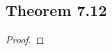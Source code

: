 \documentclass[../../main.tex]{subfiles}
\begin{document}
\subsection{Theorem 7.12}
\begin{wts}

\end{wts}
\begin{proof}

\end{proof}
\end{document}
